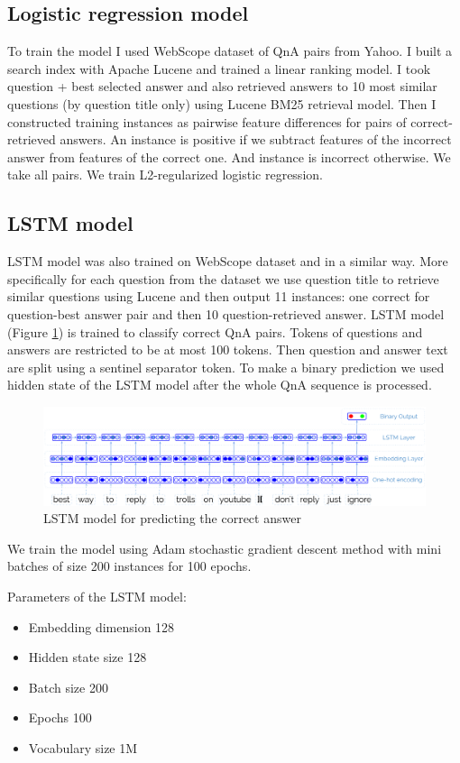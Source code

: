 \documentclass[]{article}
\begin{document}
\subsection{Logistic regression model}
To train the model I used WebScope dataset of QnA pairs from Yahoo. I built a search index with Apache Lucene and trained a linear ranking model. I took question + best selected answer and also retrieved answers to 10 most similar questions (by question title only) using Lucene BM25 retrieval model. Then I constructed training instances as pairwise feature differences for pairs of correct-retrieved answers. An instance is positive if we subtract features of the incorrect answer from features of the correct one. And instance is incorrect otherwise. We take all pairs. 
We train L2-regularized logistic regression.

\subsection{LSTM model}
LSTM model was also trained on WebScope dataset and in a similar way.
More specifically for each question from the dataset we use question title to retrieve similar questions using Lucene and then output 11 instances: one correct for question-best answer pair and then 10 question-retrieved answer. LSTM model (Figure \ref{figure:lstm_model}) is trained to classify correct QnA pairs.
Tokens of questions and answers are restricted to be at most 100 tokens. Then question and answer text are split using a sentinel separator token.
To make a binary prediction we used hidden state of the LSTM model after the whole QnA sequence is processed.

\begin{figure}
\includegraphics[width=450px]{img/qa_lstm}
\caption{LSTM model for predicting the correct answer}
\label{figure:lstm_model}
\end{figure}

We train the model using Adam stochastic gradient descent method \cite{kingma2014adam} with mini batches of size 200 instances for 100 epochs.

Parameters of the LSTM model:
\begin{itemize}
\item Embedding dimension 128
\item Hidden state size 128
\item Batch size 200
\item Epochs 100
\item Vocabulary size 1M
\end{itemize}
\end{document}
